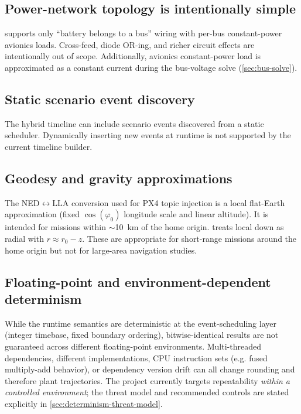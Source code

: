 \subsection{Power-network topology is intentionally simple}
 supports only ``battery belongs to a bus'' wiring with per-bus constant-power avionics loads. Cross-feed, diode OR-ing, and richer circuit effects are intentionally out of scope. Additionally, avionics constant-power load is approximated as a constant current during the bus-voltage solve (\cref{sec:bus-solve}).

\subsection{Static scenario event discovery}
The hybrid timeline can include scenario  events discovered from a static scheduler. Dynamically inserting new events at runtime is not supported by the current timeline builder.

\subsection{Geodesy and gravity approximations}
The NED$\leftrightarrow$LLA conversion used for PX4 topic injection is a local flat-Earth approximation (fixed \(\cos(\varphi_0)\) longitude scale and linear altitude). It is intended for missions within \(\sim\)\SI{10}{km} of the home origin.  treats local down as radial with $r\approx r_0 - z$. These are appropriate for short-range missions around the home origin but not for large-area navigation studies.

\subsection{Floating-point and environment-dependent determinism}
While the runtime semantics are deterministic at the event-scheduling layer (integer timebase, fixed boundary ordering), bitwise-identical results are not guaranteed across different floating-point environments. Multi-threaded dependencies, different  implementations, CPU instruction sets (e.g. fused multiply-add behavior), or dependency version drift can all change rounding and therefore plant trajectories. The project currently targets repeatability \emph{within a controlled environment}; the threat model and recommended controls are stated explicitly in \cref{sec:determinism-threat-model}.
